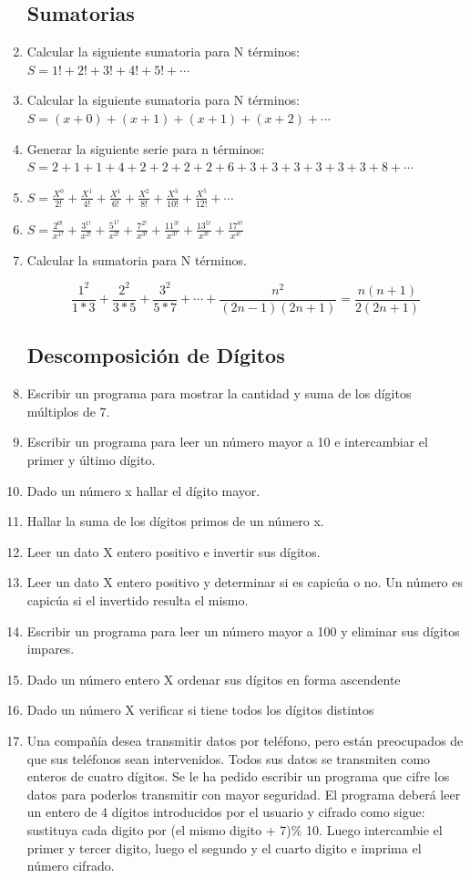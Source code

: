 \documentclass{scrartcl}
\begin{document}
\begin{enumerate}
		\subsection{Sumatorias}
		
		\item Calcular la siguiente sumatoria para N
		términos: $S=1! +2! +3! +4! +5! +\cdots$
		\item Calcular la siguiente sumatoria para N
		términos: $S=(x+0)+(x+1)+(x+1)+(x+2)+\cdots$
		\item Generar la siguiente serie para n términos:
		$S=2+1+1+ 4+ 2+ 2+ 2+ 2+ 6+3+3+3+3+3+3+8+\cdots$
		\item $S=\frac{X^{0}}{2!}+\frac{X^{1}}{4!}+\frac{X^{1}}{6!}+\frac{X^{2}}{8!}+\frac{X^{3}}{10!}+\frac{X^{5}}{12!}+\cdots$
		\item $S=\frac{2^{0!}}{x^{1!}}+\frac{3^{1!}}{x^{2!}}+\frac{5^{1!}}{x^{2!}}+\frac{7^{2!}}{x^{3!}}+\frac{11^{3!}}{x^{3!}}+\frac{13^{5!}}{x^{3!}}+\frac{17^{8!}}{x^{4!}}$
		\item Calcular la sumatoria para N términos.
		
		$$\frac{1^2}{1*3}+\frac{2^2}{3*5}+\frac{3^2}{5*7}+\cdots+\frac{n^2}{(2n-1)(2n+1)}=\frac{n(n+1)}{2(2n+1)}$$
		
		\subsection{Descomposición de Dígitos}
		
		\item Escribir un programa para mostrar la cantidad y suma de los dígitos múltiplos de 7.
		\item Escribir un programa para leer un número mayor a 10 e intercambiar el primer y último dígito.
		\item Dado un número x hallar el dígito mayor.
		\item Hallar la suma de los dígitos primos de un número x.
		\item Leer un dato X entero positivo e invertir sus dígitos.
		\item Leer un dato X entero positivo y determinar si es capicúa o no. Un número es capicúa si el invertido resulta el mismo.
		\item Escribir un programa para leer un número mayor a 100 y eliminar sus dígitos impares.
		\item Dado un número entero X ordenar sus dígitos en forma ascendente
		\item Dado un número X verificar si tiene todos los dígitos distintos
		\item Una compañía desea transmitir datos por teléfono, pero están preocupados de que sus teléfonos sean intervenidos. Todos sus datos se transmiten como enteros de cuatro dígitos. Se le ha pedido escribir un programa que cifre los datos para poderlos transmitir con mayor seguridad. El programa deberá leer un entero de 4 dígitos	introducidos por el usuario y cifrado como sigue: sustituya cada digito por (el mismo digito + 7)\% 10. Luego intercambie el primer y tercer digito, luego el segundo y el cuarto digito e imprima el número cifrado.
		

\end{enumerate}
\end{document}
